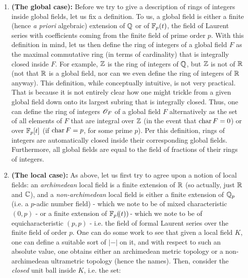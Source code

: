                 \begin{example} \label{example: ring_of_integers}
                    \noindent
                    \begin{enumerate}
                        \item \textbf{(The global case):} Before we try to give a description of rings of integers inside global fields, let us fix a definition. To us, a global field is either a finite (hence \textit{a priori} algebraic) extension of $\mathbb{Q}$ or of $\mathbb{F}_p(t)$, the field of Laurent series with coefficients coming from the finite field of prime order $p$. With this definition in mind, let us then define the ring of integers of a global field $F$ as the maximal commutative ring (in terms of cardinality) that is integrally closed inside $F$. For example, $\mathbb{Z}$ is the ring of integers of $\mathbb{Q}$, but $\mathbb{Z}$ is not of $\mathbb{R}$ (not that $\mathbb{R}$ is a global field, nor can we even define the ring of integers of $\mathbb{R}$ anyway). This definition, while conceptually intuitive, is not very practical. That is because it is not entirely clear how one might trickle from a given global field down onto its largest subring that is integrally closed. Thus, one can define the ring of integers $\mathscr{O}_F$ of a global field $F$ alternatively as the set of all elements of $F$ that are integral over $\mathbb{Z}$ (in the event that $\operatorname{char} F = 0$) or over $\mathbb{F}_p[t]$ (if $\operatorname{char} F = p$, for some prime $p$). Per this definition, rings of integers are automatically closed inside their corresponding global fields. Furthermore, all global fields are equal to the field of fractions of their rings of integers.
                        \item \textbf{(The local case):} As above, let us first try to agree upon a notion of local fields: an \textit{archimedean} local field is a finite extension of $\mathbb{R}$ (so actually, just $\mathbb{R}$ and $\mathbb{C}$), and a \textit{non-archimedean} local field is either a finite extension of $\mathbb{Q}_p$ (i.e. a $p$-adic number field) - which we note to be of mixed characteristic $(0,p)$ - or a finite extension of $\mathbb{F}_p(\!(t))\!$ - which we note to be of equicharacteristic $(p, p)$ - i.e. the field of formal Laurent series over the finite field of order $p$. One can do some work to see that given a local field $K$, one can define a suitable sort of  $|-|$ on it, and with respect to such an absolute value, one obtains either an archimedean metric topology or a non-archimedean ultrametric topology (hence the names). Then, consider the \textit{closed} unit ball inside $K$, i.e. the set:

\end{enumerate}
\end{example}
